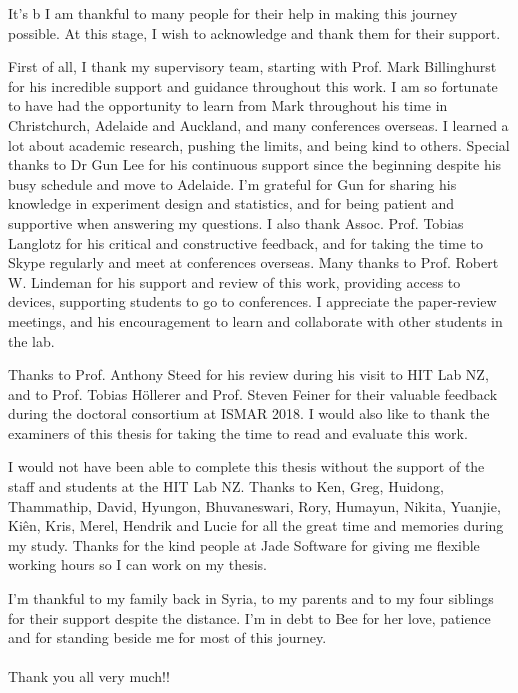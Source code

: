 \begin{acknowledgements}
\addchaptertocentry{\acknowledgementname} %
It's b
I am thankful to many people for their help in making this journey possible. At this stage, I wish to acknowledge and thank them for their support. 

First of all, I thank my supervisory team, starting with Prof. Mark Billinghurst for his incredible support and guidance throughout this work. I am so fortunate to have had the opportunity to learn from Mark throughout his time in Christchurch, Adelaide and Auckland, and many conferences overseas. I learned a lot about academic research, pushing the limits, and being kind to others. 
Special thanks to Dr Gun Lee for his continuous support since the beginning despite his busy schedule and move to Adelaide. I'm grateful for Gun for sharing his knowledge in experiment design and statistics, and for being patient and supportive when answering my questions. 
I also thank Assoc. Prof. Tobias Langlotz for his critical and constructive feedback, and for taking the time to Skype regularly and meet at conferences overseas.
Many thanks to Prof. Robert W. Lindeman for his support and review of this work, providing access to devices, supporting students to go to conferences. I appreciate the paper-review meetings, and his encouragement to learn and collaborate with other students in the lab. 

Thanks to Prof. Anthony Steed for his review during his visit to HIT Lab NZ, and to Prof. Tobias Höllerer and Prof. Steven Feiner for their valuable feedback during the doctoral consortium at ISMAR 2018. I would also like to thank the examiners of this thesis for taking the time to read and evaluate this work. 

I would not have been able to complete this thesis without the support of the staff and students at the HIT Lab NZ. Thanks to Ken, Greg, Huidong, Thammathip, David, Hyungon, Bhuvaneswari, Rory, Humayun, Nikita, Yuanjie, Kiên, Kris, Merel, Hendrik and Lucie for all the great time and memories during my study. Thanks for the kind people at Jade Software for giving me flexible working hours so I can work on my thesis.

I'm thankful to my family back in Syria, to my parents and to my four siblings for their support despite the distance. I'm in debt to Bee for her love, patience and for standing beside me for most of this journey. 
\\
\\
Thank you all very much!!

\end{acknowledgements}